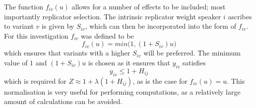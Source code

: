 \documentclass[12pt]{article}
\begin{document}
The function $f_{iv}(u)$ allows for a number of effects to be included; most importantly replicator selection. The intrinsic replicator weight speaker $i$ ascribes to variant $v$ is given by $S_{iv}$, which can then be incorporated into the form of $f_{iv}$. For this investigation $f_{iv}$ was defined to be
\begin{equation}\label{f}
f_{iv}(u) = min \big(1, (1 + S_{iv})u \big)
\end{equation}
which ensures that variants with a higher $S_{iv}$ will be preferred. The minimum value of $1$ and $(1 + S_{iv})u$ is chosen as it ensures that $y_{iv}$ satisfies
\begin{equation}
y_{iv} \leq 1 + H_{ij}
\end{equation}
which is required for $Z \approx 1 + \lambda (1 + H_{ij})$, as is the case for $f_{iv}(u) = u$. This normalisation is very useful for performing computations, as a relatively large amount of calculations can be avoided.   
\end{document}

